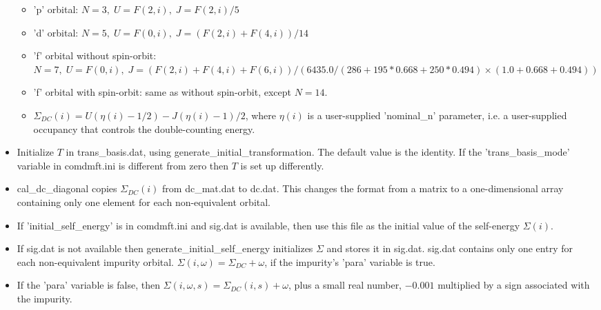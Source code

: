 \documentclass[aps,prb,singlecolumn,preprintnumbers,amsmath,amssymb]{revtex4}
\begin{document}
\begin{itemize}
\begin{itemize}
\item  'p' orbital: $N=3, \; U=F(2,i), \; J=F(2,i)/5$
\item  'd' orbital: $N=5, \; U=F(0,i), \; J=(F(2,i)+F(4,i))/14$
\item  'f' orbital without spin-orbit: $N=7, \; U=F(0,i), \; J=(F(2,i)+F(4,i)+F(6,i))/(6435.0/(286+195*0.668+250*0.494)\times(1.0+0.668+0.494))$
\item  'f' orbital with spin-orbit: same as without spin-orbit, except $N=14$.
\item $\Sigma_{DC}(i) = U(\eta(i) - 1/2) - J(\eta(i) - 1)/2$, where $\eta(i)$ is a user-supplied 'nominal\_n' parameter, i.e. a user-supplied occupancy that controls the double-counting energy.
\end{itemize}
\item Initialize $T$ in trans\_basis.dat, using generate\_initial\_transformation. The default value is the identity. If the 'trans\_basis\_mode' variable in comdmft.ini is different from zero then $T$ is set up differently.
\item cal\_dc\_diagonal copies $\Sigma_{DC}(i)$ from dc\_mat.dat to dc.dat. This changes the format from a matrix  to a one-dimensional array containing only one element for each non-equivalent orbital. 

\item If 'initial\_self\_energy' is in comdmft.ini and sig.dat is available, then use this file as the initial value of the self-energy $\Sigma(i)$.
\item If sig.dat is not available then generate\_initial\_self\_energy initializes $\Sigma$ and stores it in sig.dat. sig.dat contains only one entry for each non-equivalent impurity orbital.  $\Sigma(i,\omega) = \Sigma_{DC}  + \omega$, if the impurity's 'para' variable is true. 
\item If the 'para' variable is false, then $\Sigma(i,\omega,s) = \Sigma_{DC}(i,s)  + \omega$, plus a small  real number,  $  -0.001 $ multiplied by a sign associated with the impurity.   
\end{itemize}
\end{document}
